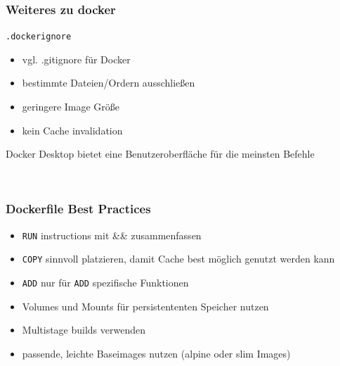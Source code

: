 \documentclass[22pt]{beamer}
\newcommand{\code}[1]{\colorbox{darkgray!20}{\texttt{#1}}}
\begin{document}
\begin{frame}[fragile]
    \frametitle{Weiteres zu docker}
    \code{.dockerignore}
    \begin{itemize}
        \item vgl. .gitignore für Docker
        \item bestimmte Dateien/Ordern ausschließen
        \item geringere Image Größe
        \item kein Cache invalidation
    \end{itemize}
    \medskip\pause
    Docker Desktop bietet eine Benutzeroberfläche für die meinsten Befehle\\\pause
    \begin{verbatim}


\end{verbatim}

\end{frame} 
\begin{frame}[t]
    \frametitle{Dockerfile Best Practices}
    \begin{itemize}
        \item \code{RUN} instructions mit \&\& zusammenfassen
        \item \code{COPY} sinnvoll platzieren, damit Cache best möglich genutzt werden kann
        \item \code{ADD} nur für \code{ADD} spezifische Funktionen
        \item Volumes und Mounts für persistententen Speicher nutzen
        \item Multistage builds verwenden
        \item passende, leichte Baseimages nutzen (alpine oder slim Images)
    \end{itemize} 
\end{frame}
\end{document}
